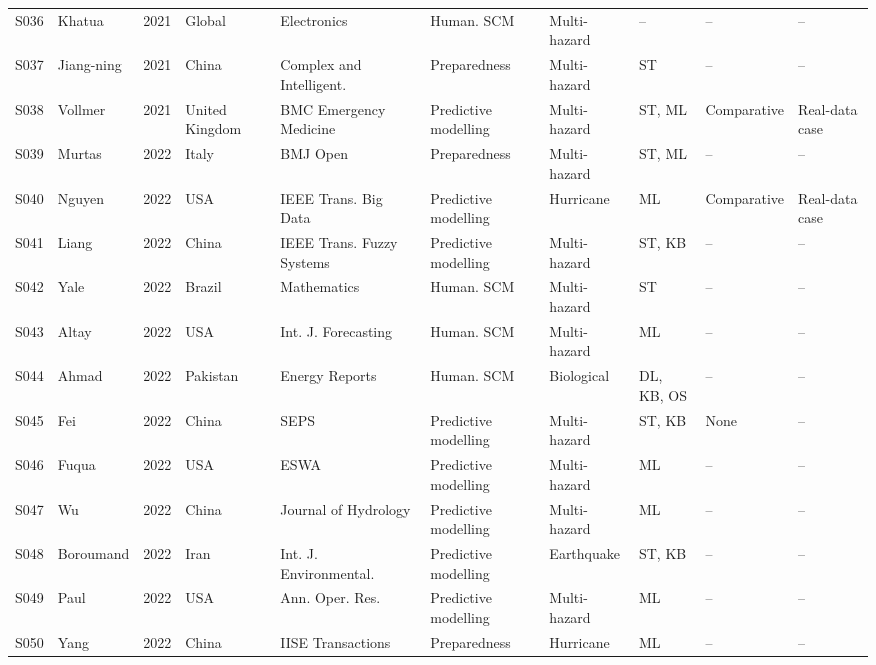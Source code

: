 \begin{landscape}
\begin{longtable}{@{}p{1.0cm}p{3.3cm}p{0.8cm}p{2.3cm}p{3.1cm}p{2.6cm}p{2.2cm}p{1.9cm}p{2.3cm}p{2.2cm}@{}}
S036 & Khatua \cite{Khatua2021ArtificialForward} & 2021 & Global & Electronics & Human. SCM & Multi-hazard & -- & -- & -- \\
S037 & Jiang-ning \cite{Jiang-ning2021ForecastingMethodology} & 2021 & China & Complex and Intelligent. & Preparedness & Multi-hazard & ST & -- & -- \\
S038 & Vollmer \cite{Vollmer2021ADepartments} & 2021 & United Kingdom & BMC Emergency Medicine & Predictive modelling & Multi-hazard & ST, ML & Comparative & Real-data case \\
S039 & Murtas \cite{Murtas2022Time-seriesSystem} & 2022 & Italy & BMJ Open & Preparedness & Multi-hazard & ST, ML & -- & -- \\
S040 & Nguyen \cite{Nguyen2022ForecastingNetwork} & 2022 & USA & IEEE Trans. Big Data & Predictive modelling & Hurricane & ML & Comparative & Real-data case \\
S041 & Liang \cite{Liang2022Time-VaryingReasoning} & 2022 & China & IEEE Trans. Fuzzy Systems & Predictive modelling & Multi-hazard & ST, KB & -- & -- \\
S042 & Yale \cite{Yale2022ABrazil} & 2022 & Brazil & Mathematics & Human. SCM & Multi-hazard & ST & -- & -- \\
S043 & Altay \cite{Altay2022ForecastingNeeds} & 2022 & USA & Int. J. Forecasting & Human. SCM & Multi-hazard & ML & -- & -- \\
S044 & Ahmad \cite{Ahmad2022Energetics4.0} & 2022 & Pakistan & Energy Reports & Human. SCM & Biological & DL, KB, OS & -- & -- \\
S045 & Fei \cite{Fei2022DemandTheory} & 2022 & China & SEPS & Predictive modelling & Multi-hazard & ST, KB & None & -- \\
S046 & Fuqua \cite{Fuqua2022CommodityPlanning} & 2022 & USA & ESWA & Predictive modelling & Multi-hazard & ML & -- & -- \\
S047 & Wu \cite{Wu2022Dynamic-LSTMChina} & 2022 & China & Journal of Hydrology & Predictive modelling & Multi-hazard & ML & -- & -- \\
S048 & Boroumand \cite{Boroumand2022AEarthquake} & 2022 & Iran & Int. J. Environmental. & Predictive modelling & Earthquake & ST, KB & -- & -- \\
S049 & Paul \cite{Paul2022AnBehavior} & 2022 & USA & Ann. Oper. Res. & Predictive modelling & Multi-hazard & ML & -- & -- \\
S050 & Yang \cite{Yang2022OptimizingRelief} & 2022 & China & IISE Transactions & Preparedness & Hurricane & ML & -- & -- \\

\end{longtable}
\end{landscape}
